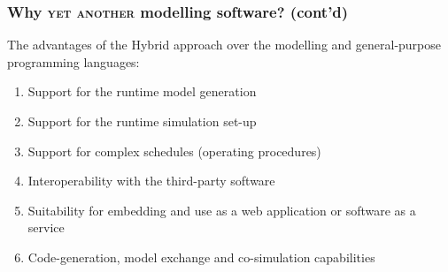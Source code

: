 \documentclass[compress,newPxFont,sthlmFooter]{beamer}
\begin{document}
\begin{frame}
\frametitle{Why \textsc{yet another} modelling software? (cont'd)}
  The advantages of the \alert{Hybrid} approach over the \alert{modelling} and \alert{general-purpose} programming languages:
    \begin{enumerate}
        \item Support for the \alert{runtime model generation}
        \item Support for the \alert{runtime simulation set-up}
        \item Support for \alert{complex schedules} (operating procedures)
        \item \alert{Interoperability} with the \alert{third-party software}
        \item Suitability for \alert{embedding} and use as a \alert{web application} or \alert{software as a service}
        \item \alert{Code-generation}, \alert{model exchange} and \alert{co-simulation} capabilities  
    \end{enumerate}
\end{frame}
% 
%     
\end{document}
